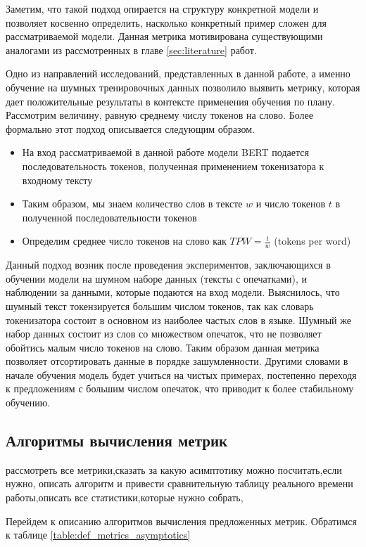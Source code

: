 \documentclass{spbau-diploma}
\begin{document}
Заметим, что такой подход опирается на структуру конкретной модели и позволяет косвенно определить, насколько конкретный пример сложен для рассматриваемой модели. Данная метрика мотивирована существующими аналогами из рассмотренных в главе \ref{sec:literature} работ.

Одно из направлений исследований, представленных в данной работе, а именно обучение на шумных тренировочных данных позволило выявить метрику, которая дает положительные результаты в контексте применения обучения по плану. Рассмотрим величину, равную среднему числу токенов на слово. Более формально этот подход описывается следующим образом.

\begin{itemize}
	\item На вход рассматриваемой в данной работе модели BERT подается последовательность токенов, полученная применением токенизатора к входному тексту
	\item Таким образом, мы знаем количество слов в тексте $w$ и число токенов $t$ в полученной последовательности токенов
	\item Определим среднее число токенов на слово как $TPW=\frac{t}{w}$ (tokens per word)
\end{itemize}

Данный подход возник после проведения экспериментов, заключающихся в обучении модели на шумном наборе данных (тексты с опечатками), и наблюдении за данными, которые подаются на вход модели. Выяснилось, что шумный текст токензируется большим числом токенов, так как словарь токенизатора состоит в основном из наиболее частых слов в языке. Шумный же набор данных состоит из слов со множеством опечаток, что не позволяет обойтись малым число токенов на слово. Таким образом данная метрика позволяет отсортировать данные в порядке зашумленности. Другими словами в начале обучения модель будет учиться на чистых примерах, постепенно переходя к предложениям с большим числом опечаток, что приводит к более стабильному обучению.

\subsection{Алгоритмы вычисления метрик}
рассмотреть все метрики,сказать за какую асимптотику можно посчитать,если нужно, описать алгоритм и привести сравнительную таблицу реального времени работы,описать все статистики,которые нужно собрать,

Перейдем к описанию алгоритмов вычисления предложенных метрик. Обратимся к таблице \ref{table:def_metrics_asymptotics} 
\end{document}
